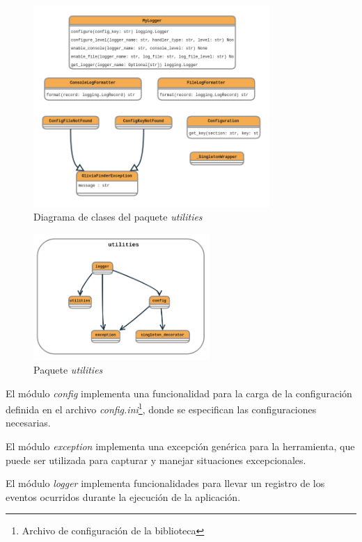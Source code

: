 \begin{figure}[ht!]
    \centering
    \includegraphics[width=0.8\textwidth]{img/anexos/utilities_classes.png}
    \caption{Diagrama de clases del paquete \textit{utilities}}
    \label{fig:utilities_classes}
\end{figure}

\begin{figure}[ht!]
    \centering
    \includegraphics[width=0.6\textwidth]{img/anexos/utilities.png}
    \caption{Paquete \textit{utilities}}
    \label{fig:utilities_package}
\end{figure}

El módulo \textit{config} implementa una funcionalidad para la carga de la configuración
definida en el archivo \textit{config.ini}\footnote{Archivo de configuración de la biblioteca}, donde se especifican las configuraciones necesarias.

El módulo \textit{exception} implementa una excepción genérica para la herramienta, que
puede ser utilizada para capturar y manejar situaciones excepcionales.

El módulo \textit{logger} implementa funcionalidades para llevar un registro de los
eventos ocurridos durante la ejecución de la aplicación.

